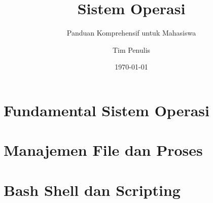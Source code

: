 \documentclass[
    a4paper,          %
    12pt,             %
    twoside,          %
    openright,        %
    bibliography=totoc, %
]{scrbook}            %
\title{Sistem Operasi}
\subtitle{Panduan Komprehensif untuk Mahasiswa}
\author{Tim Penulis}
\date{\today}
\begin{document}
\frontmatter







\tableofcontents

\listoffigures

\listoftables

\lstlistoflistings

\mainmatter

\part{Fundamental Sistem Operasi}







\part{Manajemen File dan Proses}





\part{Bash Shell dan Scripting}


\end{document}
